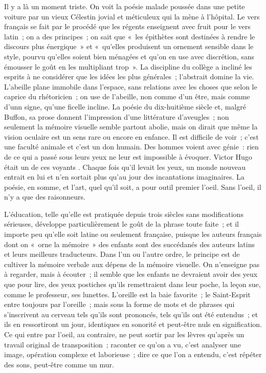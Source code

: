 \documentclass[french,twoside]{book} %
\begin{document}
Il y a là un moment triste. On voit la poésie malade poussée dans une petite voiture par un vieux Célestin jovial et méticuleux qui la mène à l’hôpital. Le vers français se fait par le procédé que les régents enseignent avec fruit pour le vers latin ; on a des principes ; on sait que « les épithètes sont destinées à rendre le discours plus énergique » et « qu’elles produisent un ornement sensible dans le style, pourvu qu’elles soient bien ménagées et qu’on en use avec discrétion, sans émousser le goût en les multipliant trop ». La discipline du collège a incliné les esprits à ne considérer que les idées les plus générales ; l’abstrait domine la vie. L’abeille plane immobile dans l’espace, sans relations avec les choses que selon le caprice du rhétoricien ; on use de l’abeille, non comme d’un être, mais comme d’unn signe, qu’une ficelle incline. La poésie du dix-huitième siècle et, malgré Buffon, sa prose donnent l’impression d’une littérature d’aveugles ; non seulement la mémoire visuelle semble partout abolie, mais on dirait que même la vision oculaire est un sens rare ou encore en enfance. Il est difficile de voir ; c’est une faculté animale et c’est un don humain. Des hommes voient avec génie : rien de ce qui a passé sous leurs yeux ne leur est impossible à évoquer. Victor Hugo était un de ces voyants . Chaque fois qu’il levait les yeux, un monde nouveau entrait en lui et n’en sortait plus qu’au jour des incantations imaginaires. La poésie, en somme, et l’art, quel qu’il soit, a pour outil premier l’oeil. Sans l’oeil, il n’y a que des raisonneurs.\par
L’éducation, telle qu’elle est pratiquée depuis trois siècles sans modifications sérieuses, développe particulièrement le goût de la phrase toute faite ; et il importe peu qu’elle soit latine ou seulement française, puisque les auteurs français dont on « orne la mémoire » des enfants sont des succédanés des auteurs latins et leurs meilleurs traducteurs. Dans l’un ou l’autre ordre, le principe est de cultiver la mémoire verbale aux dépens de la mémoire visuelle. On n’enseigne pas à regarder, mais à écouter ; il semble que les enfants ne devraient avoir des yeux que pour lire, des yeux postiches qu’ils remettraient dans leur poche, la leçon sue, comme le professeur, ses lunettes. L’oreille est la baie favorite ; le Saint-Esprit entre toujours par l’oreille ; mais sous la forme de mots et de phrases qui s’inscrivent au cerveau tels qu’ils sont prononcés, tels qu’ils ont été entendus ; et ils en ressortiront un jour, identiques en sonorité et peut-être nuls en signification. Ce qui entre par l’oeil, au contraire, ne peut sortir par les lèvres qu’après un travail original de transposition ; raconter ce qu’on a vu, c’est analyser une image, opération complexe et laborieuse ; dire ce que l’on a entendu, c’est répéter des sons, peut-être comme un mur.\par
\end{document}
